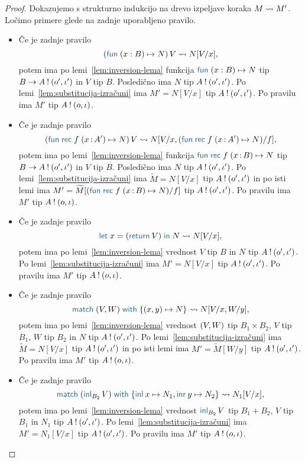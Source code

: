 \begin{proof}
	Dokazujemo s strukturno indukcijo na drevo izpeljave koraka $M \leadsto M'$.
	Ločimo primere glede na zadnje uporabljeno pravilo.
	
	\begin{itemize}
		\item Če je zadnje pravilo $$\tmapp{(\tmfun{x : B}{N})}{V} \reduces N[V/x],$$ potem ima po lemi~\ref{lem:inversion-lema} funkcija $\tmfun{x : B}{N}$ tip $B \to A \mathbin{!} (o', \iota')$ in $V$ tip $B$. Posledično ima $N$ tip $A \mathbin{!} (o', \iota')$. Po lemi~\ref{lem:substitucija-izračuni} ima $M' = N[V/x]$ tip $A \mathbin{!} (o', \iota')$.
		Po pravilu  ima $M'$ tip $A \mathbin{!} (o, \iota)$.
		
		\item Če je zadnje pravilo $$\tmapp{(\tmfunrec{f}{x \of A'}{N})}{V} \reduces N[V/x, (\tmfunrec{f}{x \of A'}{N})/f],$$ potem ima po lemi~\ref{lem:inversion-lema} funkcija $\tmfunrec{f}{x \of B}{N}$ tip $B \to A \mathbin{!} (o', \iota')$ in $V$ tip $B$. Posledično ima $N$ tip $A \mathbin{!} (o', \iota')$. Po lemi~\ref{lem:substitucija-izračuni} ima $\widetilde{M} = N[V/x]$ tip $A \mathbin{!} (o', \iota')$ in po isti lemi ima $M' = \widetilde{M}[(\tmfunrec{f}{x \of B}{N})/f]$ tip $A \mathbin{!} (o', \iota')$.
		Po pravilu  ima $M'$ tip $A \mathbin{!} (o, \iota)$.
		
		\item Če je zadnje pravilo $$\tmlet{x}{(\tmreturn V)}{N} \reduces N[V/x],$$ potem ima po lemi~\ref{lem:inversion-lema} vrednost $V$ tip $B$ in $N$ tip $A \mathbin{!} (o', \iota')$.
		Po lemi~\ref{lem:substitucija-izračuni} ima $M' = N[V/x]$ tip $A \mathbin{!} (o', \iota')$.
		Po pravilu  ima $M'$ tip $A \mathbin{!} (o, \iota)$.
		
		\item Če je zadnje pravilo $$\tmmatch{\tmpair{V}{W}}{\tmpair{x}{y} \mapsto N} \reduces N[V/x, W/y],$$ potem ima po lemi~\ref{lem:inversion-lema} vrednost $( V , W )$ tip $B_1 \times B_2$, $V$ tip $B_1$, $W$ tip $B_2$ in $N$ tip $A \mathbin{!} (o', \iota')$. Po lemi~\ref{lem:substitucija-izračuni} ima $\widetilde{M} = N[V/x]$ tip $A \mathbin{!} (o', \iota')$ in po isti lemi ima $M' = \widetilde{M}[W/y]$ tip $A \mathbin{!} (o', \iota')$.
		Po pravilu  ima $M'$ tip $A \mathbin{!} (o, \iota)$.
		
		\item Če je zadnje pravilo $$\tmmatch{(\tminl[B_2]{V})}{\tminl{x} \mapsto N_1, \tminr{y} \mapsto N_2} \reduces N_1[V/x],$$ potem ima po lemi~\ref{lem:inversion-lema} vrednost $\tminl[B_2]{V}$ tip $B_1 + B_2$, $V$ tip $B_1$ in $N_1$ tip $A \mathbin{!} (o', \iota')$.
		Po lemi~\ref{lem:substitucija-izračuni} ima $M' = N_1[V/x]$ tip $A \mathbin{!} (o', \iota')$.
		Po pravilu  ima $M'$ tip $A \mathbin{!} (o, \iota)$.
		

\end{itemize}
\end{proof}
